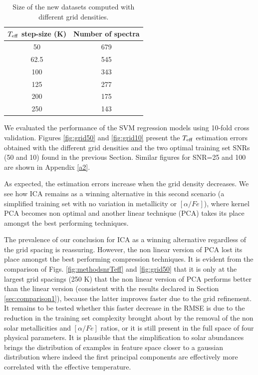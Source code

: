 \documentclass[a4paper,fleqn,usenatbib]{mnras}
\begin{document}
{{{\begin{table}
\centering
\caption{Size of the new datasets computed with different grid densities.}
\label{tab:grid}
\begin{tabular}{c c}
\hline
\textbf{$T_{\rm eff}$ step-size (K)} & \textbf{Number of spectra} \\
\hline
50 & 679 \\
62.5 & 545 \\
100 & 343 \\
125 & 277 \\
200 & 175\\
250 & 143\\
\hline
\end{tabular}
\end{table}

We evaluated the performance of the SVM regression models using
10-fold cross validation. Figures \ref{fig:grid50} and
\ref{fig:grid10} present the $T_{\rm eff}$ estimation errors obtained
with the different grid densities and the two optimal training set
SNRs (50 and 10) found in the previous Section. Similar 
figures for SNR=25 and 100 are shown in Appendix \ref{a2}.

As expected, the estimation errors increase when the grid 
density decreases. We see how ICA remains as a winning 
alternative in this second scenario (a simplified training 
set with no variation in metallicity or $\left[ \alpha/Fe \right]$), 
where kernel PCA becomes non optimal and another linear 
technique (PCA) takes its place amongst the best performing 
techniques. 

The prevalence of our conclusion for ICA as a winning alternative 
regardless of the grid spacing is reassuring. However, the non linear 
version of PCA lost its place amongst the best 
performing compression techniques. It is 
evident from the comparison of Figs. \ref{fig:methodsnrTeff} and 
\ref{fig:grid50} that it is only at the largest grid spacings (250 K) 
that the non linear version of PCA performs better than the linear 
version (consistent with the results declared in Section 
\ref{sec:comparison1}), because the latter improves faster due to 
the grid refinement. It remains to be tested whether this faster 
decrease in the RMSE is due to the 
reduction in the training set complexity brought about by the removal 
of the non solar metallicities and $\left[ \alpha/Fe \right]$ ratios, 
or it is still present in the full space of four physical parameters. 
It is plausible that the simplification to solar abundances brings the 
distribution of examples in feature space closer to a gaussian distribution 
where indeed the first principal components are effectively more 
correlated with the effective temperature.

}}}
\end{document}
